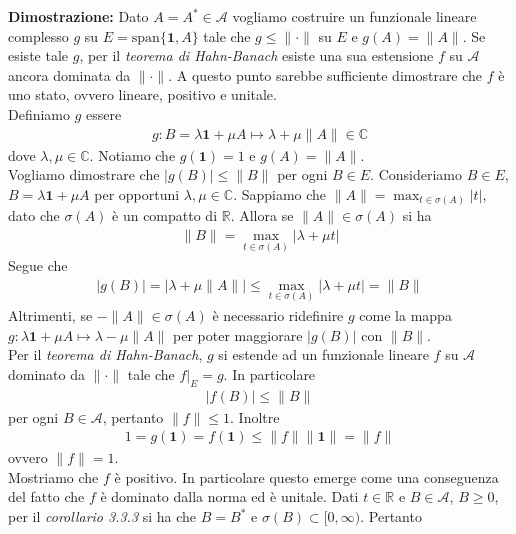 \documentclass{article}
\numberwithin{equation}{subsection}
\begin{document}
\textbf{Dimostrazione:} Dato $A = A^* \in \mathscr{A}$ vogliamo costruire un funzionale lineare complesso $g$ su $E = \mathrm{span}\{\mathbf{1}, A\}$ tale che $g \leq \|\cdot\|$ su $E$ e $g(A) = \|A\|$. Se esiste tale $g$, per il \textit{teorema di Hahn-Banach} esiste una sua estensione $f$ su $\mathscr{A}$ ancora dominata da $\|\cdot\|$. A questo punto sarebbe sufficiente dimostrare che $f$ è uno stato, ovvero lineare, positivo e unitale. \\
Definiamo $g$ essere
\begin{align*}
    g : B = \lambda\mathbf{1} + \mu A \mapsto \lambda + \mu\|A\| \in \mathbb{C}
\end{align*}
dove $\lambda, \mu \in \mathbb{C}$. Notiamo che $g(\mathbf{1}) = 1$ e $g(A) = \|A\|$. \\
Vogliamo dimostrare che $|g(B)| \leq \|B\|$ per ogni $B \in E$. Consideriamo $B \in E$, $B = \lambda\mathbf{1} + \mu A$ per opportuni $\lambda, \mu \in \mathbb{C}$. Sappiamo che $\|A\| = \max_{t \in \sigma(A)} |t|$, dato che $\sigma(A)$ è un compatto di $\mathbb{R}$. Allora se $\|A\| \in \sigma(A)$ si ha
\begin{align*}
    \|B\| = \max_{t \in \sigma(A)} |\lambda + \mu t|
\end{align*}
Segue che
\begin{align*}
    |g(B)| = |\lambda + \mu\|A\|| \leq \max_{t \in \sigma(A)}|\lambda + \mu t| = \|B\|
\end{align*}
Altrimenti, se $-\|A\| \in \sigma(A)$ è necessario ridefinire $g$ come la mappa $g : \lambda\mathbf{1} + \mu A \mapsto \lambda - \mu\|A\|$ per poter maggiorare $|g(B)|$ con $\|B\|$. \\
Per il \textit{teorema di Hahn-Banach}, $g$ si estende ad un funzionale lineare $f$ su $\mathscr{A}$ dominato da $\|\cdot\|$ tale che $f|_E = g$. In particolare
\begin{align*}
    |f(B)| \leq \|B\|
\end{align*}
per ogni $B \in \mathscr{A}$, pertanto $\|f\| \leq 1$. Inoltre
\begin{align*}
    1 = g(\mathbf{1}) = f(\mathbf{1}) \leq \|f\|\|\mathbf{1}\| = \|f\|
\end{align*}
ovvero $\|f\| = 1$. \\
Mostriamo che $f$ è positivo. In particolare questo emerge come una conseguenza del fatto che $f$ è dominato dalla norma ed è unitale. Dati $t \in \mathbb{R}$ e $B \in \mathscr{A}$, $B \geq 0$, per il \textit{corollario 3.3.3} si ha che $B = B^*$ e $\sigma(B) \subset [0, \infty)$. Pertanto
\end{document}
